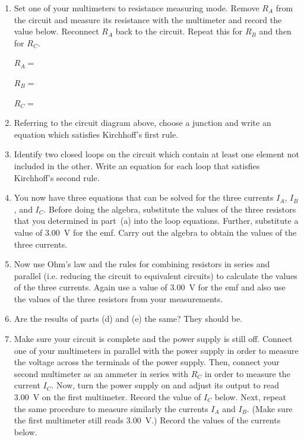 \begin{enumerate}[labparts]

\item Set one of your multimeters to resistance measuring mode. Remove $R_A$ from the circuit and measure its resistance with the multimeter and record the value below. Reconnect $R_A$ back to the circuit. Repeat this for $R_B$ and then for $R_C$.

\hspace{0.5in}$R_A=$

\hspace{0.5in}$R_B=$

\hspace{0.5in}$R_C=$


\item Referring to the circuit diagram above, choose a junction and write an equation
which satisfies Kirchhoff's first rule.
\answerspace{20mm}

\item Identify two closed loops on the circuit which contain at least one
element not included in the other. Write an equation for each loop
that satisfies Kirchhoff's second rule.
\answerspace{30mm}

\item You now have three equations that can be solved for the three currents $I_A$, $I_B$, and $I_C$.
Before doing the algebra, substitute the values of the three resistors that you determined in part~(a) into the loop equations. Further, substitute a value of 3.00~V for the emf. Carry out the algebra to obtain the values of the three currents.
\answerspace{5in}

\item Now use Ohm's law and the rules for combining resistors in series and parallel (i.e. reducing the circuit to equivalent circuits) to calculate the values of the three currents. Again use a value of 3.00~V for the emf and also use the values of the three resistors from your measurements.
\answerspace{3.5in}

\item Are the results of parts (d) and (e) the same? They should be.
\answerspace{15mm}

\item Make sure your circuit is complete and the power supply is still off. Connect one of your multimeters in parallel with the power supply in order to measure the voltage across the terminals of the power supply. Then, connect your second multimeter as an ammeter in series with $R_C$ in order to measure the current $I_C$. Now, turn the power supply on and adjust its output to read 3.00~V on the first multimeter. Record the value of $I_C$ below. Next, repeat the same procedure to measure similarly the currents $I_A$ and $I_B$. (Make sure the first multimeter still reads 3.00~V.) Record the values of the currents below.


\end{enumerate}

